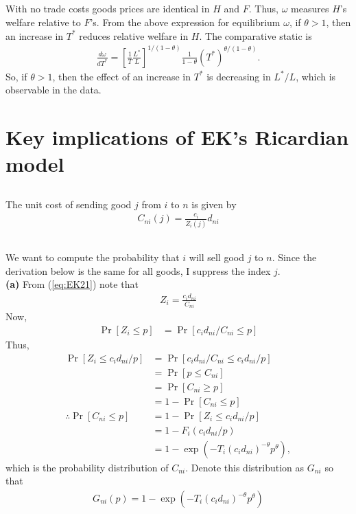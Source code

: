 \documentclass[12pt]{article}
\begin{document}
\subsection{}
With no trade costs goods prices are identical in $H$ and $F$. Thus, $\omega$ measures $H$'s welfare relative to $F$'s. From the above expression for equilibrium $\omega$, if $\theta > 1$, then an increase in $T^*$ reduces relative welfare in $H$. The comparative static is
\begin{align*}
\frac{d\omega}{dT^*} = \left[\frac{1}{T}\frac{L^*}{L}\right]^{1/(1-\theta)} \frac{1}{1-\theta} (T^*)^{\theta/(1-\theta)}.
\end{align*}
So, if $\theta > 1$, then the effect of an increase in $T^*$ is decreasing in $L^*/L$, which is observable in the data.

\newpage

\section{Key implications of EK's Ricardian model}

\subsection{}
The unit cost of sending good $j$ from $i$ to $n$ is given by
\begin{align}
C_{ni}(j) = \frac{c_i}{Z_i(j)}d_{ni} \label{eq:EK21}
\end{align}

\subsection{}
We want to compute the probability that $i$ will sell good $j$ to $n$. Since the derivation below is the same for all goods, I suppress the index $j$. \\

\textbf{(a)} From (\ref{eq:EK21}) note that 
\begin{align*}
Z_i = \frac{c_id_{ni}}{C_{ni}}
\end{align*}
Now,
\begin{align*}
\Pr[Z_i \leq p] &= \Pr[{c_id_{ni}}/{C_{ni}} \leq p]
\end{align*}
Thus,
\begin{align*}
\Pr[Z_i \leq {c_id_{ni}}/{p} ] &=  \Pr[{c_id_{ni}}/{C_{ni}} \leq {c_id_{ni}}/{p}]\\
&= \Pr[p \leq C_{ni}]\\
&= \Pr[C_{ni} \geq p]\\
&= 1- \Pr[C_{ni} \leq p]\\
\therefore \Pr[C_{ni} \leq p] &= 1-\Pr[Z_i \leq {c_id_{ni}}/{p} ]\\
&= 1- F_i(c_id_{ni}/{p})\\
&= 1- \exp(-T_i(c_id_{ni})^{-\theta}p^\theta),
\end{align*}
which is the probability distribution of $C_{ni}$. Denote this distribution as $G_{ni}$ so that
\begin{align}
G_{ni}(p) = 1- \exp(-T_i(c_id_{ni})^{-\theta}p^\theta) \label{eq:EK22}
\end{align}
\end{document}
